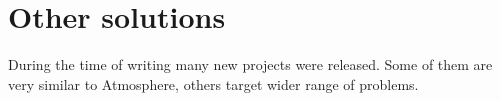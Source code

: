 \section{Other solutions}

During the time of writing many new projects were released. Some of them are very similar to Atmosphere, others target wider range of problems.
